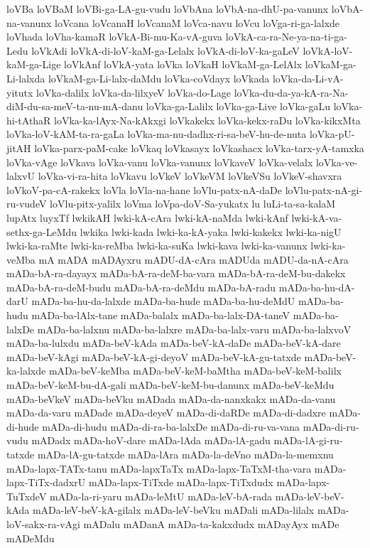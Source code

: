 {loVBa
loVBaM
loVBi-ga-LA-gu-vudu
loVbAna
loVbA-na-dhU-pa-vanunx
loVbA-na-vanunx
loVcana
loVcanaH
loVcanaM
loVca-navu
loVcu
loVga-ri-ga-lalxde
loVhada
loVha-kamaR
loVkA-Bi-mu-Ka-vA-guva
loVkA-ca-ra-Ne-ya-na-ti-ga-Ledu
loVkAdi
loVkA-di-loV-kaM-ga-Lelalx
loVkA-di-loV-ka-gaLeV
loVkA-loV-kaM-ga-Lige
loVkAnf
loVkA-yata
loVka
loVkaH
loVkaM-ga-LelAlx
loVkaM-ga-Li-lalxda
loVkaM-ga-Li-lalx-daMdu
loVka-coVdayx
loVkada
loVka-da-Li-vA-yitutx
loVka-dalilx
loVka-da-lilxyeV
loVka-do-Lage
loVka-du-da-ya-kA-ra-Na-diM-du-sa-meV-ta-nu-mA-danu
loVka-ga-Lalilx
loVka-ga-Live
loVka-gaLu
loVka-hi-tAthaR
loVka-ka-lAyx-Na-kAkxgi
loVkakekx
loVka-kekx-raDu
loVka-kikxMta
loVka-loV-kAM-ta-ra-gaLa
loVka-ma-nu-dadhx-ri-sa-beV-hu-de-nuta
loVka-pU-jitAH
loVka-parx-paM-cake
loVkaq
loVkasayx
loVkashacx
loVka-tarx-yA-tamxka
loVka-vAge
loVkava
loVka-vanu
loVka-vanunx
loVkaveV
loVka-velalx
loVka-ve-lalxvU
loVka-vi-ra-hita
loVkavu
loVkeV
loVkeVM
loVkeVSu
loVkeV-shavxra
loVkoV-pa-cA-rakekx
loVla
loVla-na-hane
loVlu-patx-nA-daDe
loVlu-patx-nA-gi-ru-vudeV
loVlu-pitx-yalilx
loVma
loVpa-doV-Sa-yukatx
lu
luLi-ta-sa-kalaM
lupAtx
luyxTf
lwkikAH
lwki-kA-cAra
lwki-kA-naMda
lwki-kAnf
lwki-kA-va-sethx-ga-LeMdu
lwkika
lwki-kada
lwki-ka-kA-yaka
lwki-kakekx
lwki-ka-nigU
lwki-ka-raMte
lwki-ka-reMba
lwki-ka-suKa
lwki-kava
lwki-ka-vanunx
lwki-ka-veMba
mA
mADA
mADAyxru
mADU-dA-cAra
mADUda
mADU-da-nA-cAra
mADa-bA-ra-dayayx
mADa-bA-ra-deM-ba-vara
mADa-bA-ra-deM-bu-dakekx
mADa-bA-ra-deM-budu
mADa-bA-ra-deMdu
mADa-bA-radu
mADa-ba-hu-dA-darU
mADa-ba-hu-da-lalxde
mADa-ba-hude
mADa-ba-hu-deMdU
mADa-ba-hudu
mADa-ba-lAlx-tane
mADa-balalx
mADa-ba-lalx-DA-taneV
mADa-ba-lalxDe
mADa-ba-lalxnu
mADa-ba-lalxre
mADa-ba-lalx-varu
mADa-ba-lalxvoV
mADa-ba-lulxdu
mADa-beV-kAda
mADa-beV-kA-daDe
mADa-beV-kA-dare
mADa-beV-kAgi
mADa-beV-kA-gi-deyoV
mADa-beV-kA-gu-tatxde
mADa-beV-ka-lalxde
mADa-beV-keMba
mADa-beV-keM-baMtha
mADa-beV-keM-balilx
mADa-beV-keM-bu-dA-gali
mADa-beV-keM-bu-danunx
mADa-beV-keMdu
mADa-beVkeV
mADa-beVku
mADada
mADa-da-nanxkakx
mADa-da-vanu
mADa-da-varu
mADade
mADa-deyeV
mADa-di-daRDe
mADa-di-dadxre
mADa-di-hude
mADa-di-hudu
mADa-di-ra-ba-lalxDe
mADa-di-ru-va-vana
mADa-di-ru-vudu
mADadx
mADa-hoV-dare
mADa-lAda
mADa-lA-gadu
mADa-lA-gi-ru-tatxde
mADa-lA-gu-tatxde
mADa-lAra
mADa-la-deVno
mADa-la-memxnu
mADa-lapx-TATx-tanu
mADa-lapxTaTx
mADa-lapx-TaTxM-tha-vara
mADa-lapx-TiTx-dadxrU
mADa-lapx-TiTxde
mADa-lapx-TiTxdudx
mADa-lapx-TuTxdeV
mADa-la-ri-yaru
mADa-leMtU
mADa-leV-bA-rada
mADa-leV-beV-kAda
mADa-leV-beV-kA-gilalx
mADa-leV-beVku
mADali
mADa-lilalx
mADa-loV-sakx-ra-vAgi
mADalu
mADanA
mADa-ta-kakxdudx
mADayAyx
mADe
mADeMdu
}
